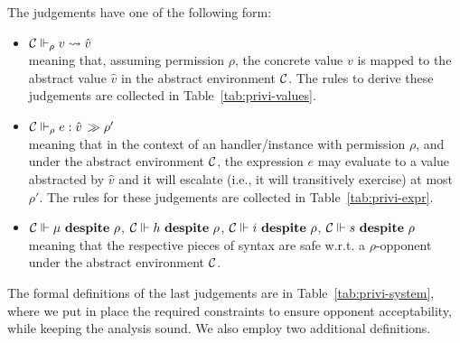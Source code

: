 The judgements have one of the following form:
\begin{itemize}
\item ${\cal C} \Vdash_\rho v \rightsquigarrow \hat{v}$\\
meaning that, assuming permission $\rho$, the concrete value $v$ is
mapped to the abstract value $\hat{v}$ in the abstract environment ${\cal C}$. 
The rules to derive these judgements are collected in
Table~\ref{tab:privi-values}.
\item 
 ${\cal C}  \Vdash_\rho e: \hat{v} \,\gg \rho'$\\
meaning that in the context of an handler/instance with permission
$\rho$, and under the abstract environment ${\cal C}$, 
the expression $e$ may evaluate to a value abstracted by $\hat{v}$ 
and it will escalate (i.e., it will transitively exercise) at most
$\rho'$. The rules for these judgements 
are collected in Table~\ref{tab:privi-expr}. 
\item ${\cal C} \Vdash \mu \ \mathbf{despite}\ \rho$, ${\cal C} \Vdash h \ \mathbf{despite}\ \rho$, 
${\cal C} \Vdash i \ \mathbf{despite}\ \rho$, ${\cal C} \Vdash s \ \mathbf{despite}\ \rho$\\
meaning that the respective pieces of syntax are safe w.r.t. a $\rho$-opponent
under the abstract environment ${\cal C}$.
\end{itemize}
The formal definitions of the last judgements are in Table~\ref{tab:privi-system},
where we put in place the required constraints to ensure opponent acceptability,
while keeping the analysis sound. We also employ two additional definitions. 

